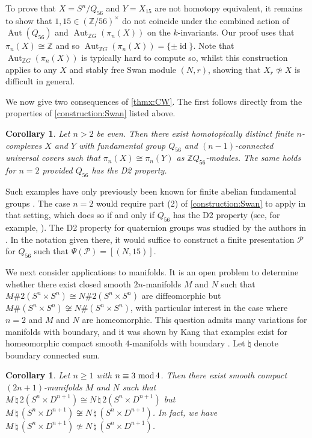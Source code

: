 \documentclass[11pt,leqno,a4paper]{amsart}
\newcommand{\Z}{\mathbb{Z}}
\renewcommand{\mod}{\,\,\text{\normalfont mod}\,}
\DeclareMathOperator{\Aut}{Aut}
\DeclareMathOperator{\id}{id}
\newtheorem{corollary}[thm]{Corollary}
\theoremstyle{definition}
\theoremstyle{remark}
\theoremstyle{custom}
\begin{document}
To prove that $X = S^n/Q_{56}$ and $Y = X_{15}$ are not homotopy equivalent, it remains to show that $1, 15 \in (\Z/56)^\times$ do not coincide under the combined action of $\Aut(Q_{56})$ and $\Aut_{\Z G}(\pi_n(X))$ on the $k$-invariants. Our proof uses that $\pi_n(X) \cong \Z$ and so $\Aut_{\Z G}(\pi_n(X)) = \{\pm \id\}$.
Note that $\Aut_{\Z G}(\pi_n(X))$ is typically hard to compute so, whilst this construction applies to any $X$ and stably free Swan module $(N,r)$, showing that $X_r \not \simeq X$ is difficult in general.

We now give two consequences of \cref{thmx:CW}. The first follows directly from the properties of \cref{construction:Swan} listed above.

\begin{corollary} \label{cor:ThmB-1}
  Let $n > 2$ be even. Then there exist homotopically distinct finite $n$-complexes $X$ and $Y$ with fundamental group $Q_{56}$ and $(n-1)$-connected universal covers such that $\pi_n(X) \cong \pi_n(Y)$ as $\Z Q_{56}$-modules. The same holds for $n = 2$ provided $Q_{56}$ has the {\normalfont D2} property.
\end{corollary}

Such examples have only previously been known for finite abelian fundamental groups \cite{SD79}. The case $n=2$ would require part (2) of \cref{construction:Swan} to apply in that setting, which does so if and only if $Q_{56}$ has the D2 property (see, for example, \cite[Proposition 5.1]{Ni20a}). The D2 property for quaternion groups was studied by the authors in \cite{HN25}. In the notation given there, it would suffice to construct a finite presentation $\mathcal{P}$ for $Q_{56}$ such that $\Psi(\mathcal{P}) = [(N,15)]$.

We next consider applications to manifolds. It is an open problem to determine whether there exist closed smooth $2n$-manifolds $M$ and $N$ such that $M \# 2(S^n \times S^n) \cong N \# 2(S^n \times S^n)$ are diffeomorphic but $M \# (S^n \times S^n) \not \cong N \# (S^n \times S^n)$, with particular interest in the case where $n=2$ and $M$ and $N$ are homeomorphic.
This question admits many variations for manifolds with boundary, and it was shown by Kang that examples exist for homeomorphic compact smooth $4$-manifolds with boundary \cite{Ka22}. 
Let $\natural$ denote boundary connected sum.

\begin{corollary} \label{cor:ThmB-2}
Let $n \ge 1$ with $n \equiv 3 \mod 4$. Then there exist smooth compact $(2n+1)$-manifolds $M$ and $N$ such that $M \, \natural \, 2(S^n \times D^{n+1}) \cong N \, \natural \, 2(S^n \times D^{n+1})$ but $M \, \natural \, (S^n \times D^{n+1}) \not \cong N \, \natural \, (S^n \times D^{n+1})$. In fact, we have $M \, \natural \, (S^n \times D^{n+1}) \not \simeq N \, \natural \, (S^n \times D^{n+1})$.
\end{corollary}
\end{document}
